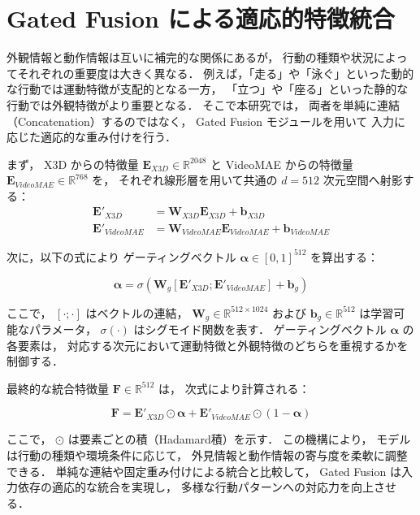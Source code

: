 \section{Gated Fusion による適応的特徴統合}

外観情報と動作情報は互いに補完的な関係にあるが，
行動の種類や状況によってそれぞれの重要度は大きく異なる．
例えば，「走る」や「泳ぐ」といった動的な行動では運動特徴が支配的となる一方，
「立つ」や「座る」といった静的な行動では外観特徴がより重要となる．
そこで本研究では，
両者を単純に連結（Concatenation）するのではなく，
Gated Fusion モジュールを用いて
入力に応じた適応的な重み付けを行う．

まず，
X3D からの特徴量 $\mathbf{E}_{X3D} \in \mathbb{R}^{2048}$ と
VideoMAE からの特徴量
$\mathbf{E}_{VideoMAE} \in \mathbb{R}^{768}$ を，
それぞれ線形層を用いて共通の
$d = 512$ 次元空間へ射影する：
\begin{align}
  \mathbf{E}'_{X3D} &= \mathbf{W}_{X3D} \mathbf{E}_{X3D} + \mathbf{b}_{X3D} \\
  \mathbf{E}'_{VideoMAE} &= \mathbf{W}_{VideoMAE} \mathbf{E}_{VideoMAE} + \mathbf{b}_{VideoMAE}
\end{align}

次に，以下の式により
ゲーティングベクトル
$\boldsymbol{\alpha} \in [0,1]^{512}$ を算出する：

\begin{equation}
  \boldsymbol{\alpha}
  = \sigma(\mathbf{W}_g[\mathbf{E}'_{X3D}; \mathbf{E}'_{VideoMAE}] + \mathbf{b}_g)
  \label{eq:gating_vector}
\end{equation}

ここで，
$[\cdot;\cdot]$ はベクトルの連結，
$\mathbf{W}_g \in \mathbb{R}^{512 \times 1024}$ および
$\mathbf{b}_g \in \mathbb{R}^{512}$ は学習可能なパラメータ，
$\sigma(\cdot)$ はシグモイド関数を表す．
ゲーティングベクトル $\boldsymbol{\alpha}$ の各要素は，
対応する次元において運動特徴と外観特徴のどちらを重視するかを制御する．

最終的な統合特徴量 $\mathbf{F} \in \mathbb{R}^{512}$ は，
次式により計算される：

\begin{equation}
  \mathbf{F}
  = \mathbf{E}'_{X3D} \odot \boldsymbol{\alpha}
  + \mathbf{E}'_{VideoMAE} \odot (1 - \boldsymbol{\alpha})
  \label{eq:fused_feature}
\end{equation}

ここで，
$\odot$ は要素ごとの積（Hadamard積）を示す．
この機構により，
モデルは行動の種類や環境条件に応じて，
外見情報と動作情報の寄与度を柔軟に調整できる．
単純な連結や固定重み付けによる統合と比較して，
Gated Fusion は入力依存の適応的な統合を実現し，
多様な行動パターンへの対応力を向上させる．

